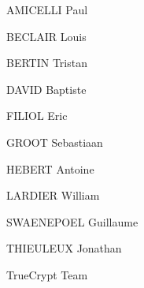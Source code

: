 
\begin{DoxyItemize}
\item A\+M\+I\+C\+E\+L\+LI Paul
\item B\+E\+C\+L\+A\+IR Louis
\item B\+E\+R\+T\+IN Tristan
\item D\+A\+V\+ID Baptiste
\item F\+I\+L\+I\+OL Eric
\item G\+R\+O\+OT Sebastiaan
\item H\+E\+B\+E\+RT Antoine
\item L\+A\+R\+D\+I\+ER William
\item S\+W\+A\+E\+N\+E\+P\+O\+EL Guillaume
\item T\+H\+I\+E\+U\+L\+E\+UX Jonathan
\item True\+Crypt Team 
\end{DoxyItemize}